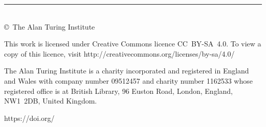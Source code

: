 \documentclass[a4paper]{article}
\begin{document}
\begin{titlepage}
\raggedright\setlength{\parindent}{0pt}%
\vspace*{5\turingcolht}

\small\raggedright%
\fontsize{8}{11}\selectfont
{\offinterlineskip\rule{9\turingcolwd}{0.15ex}\\[0.5ex]
\copyright\ The Alan Turing Institute \reportCopyrightDate\par}
\medskip 

This work is licensed under Creative Commons licence CC~BY-SA~4.0. To
view a copy of this licence, visit
http://creativecommons.org/licenses/by-sa/4.0/ \medskip

The Alan Turing Institute is a charity incorporated and registered in
England and Wales with company number 09512457 and charity number
1162533 whose registered office is at British Library, 96 Euston Road,
London, England, NW1~2DB, United Kingdom.
\medskip

https://doi.org/\reportDOI
\end{titlepage}
\end{document}
